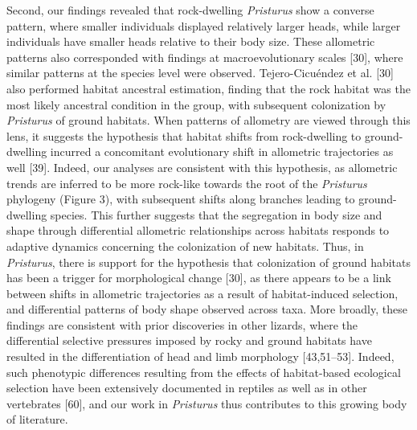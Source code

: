 \documentclass[
  11pt,
]{article}
\begin{document}
Second, our findings revealed that rock-dwelling \emph{Pristurus} show a
converse pattern, where smaller individuals displayed relatively larger
heads, while larger individuals have smaller heads relative to their
body size. These allometric patterns also corresponded with findings at
macroevolutionary scales {[}30{]}, where similar patterns at the species
level were observed. Tejero-Cicuéndez et al. {[}30{]} also performed
habitat ancestral estimation, finding that the rock habitat was the most
likely ancestral condition in the group, with subsequent colonization by
\emph{Pristurus} of ground habitats. When patterns of allometry are
viewed through this lens, it suggests the hypothesis that habitat shifts
from rock-dwelling to ground-dwelling incurred a concomitant
evolutionary shift in allometric trajectories as well {[}39{]}. Indeed,
our analyses are consistent with this hypothesis, as allometric trends
are inferred to be more rock-like towards the root of the
\emph{Pristurus} phylogeny (Figure 3), with subsequent shifts along
branches leading to ground-dwelling species. This further suggests that
the segregation in body size and shape through differential allometric
relationships across habitats responds to adaptive dynamics concerning
the colonization of new habitats. Thus, in \emph{Pristurus}, there is
support for the hypothesis that colonization of ground habitats has been
a trigger for morphological change {[}30{]}, as there appears to be a
link between shifts in allometric trajectories as a result of
habitat-induced selection, and differential patterns of body shape
observed across taxa. More broadly, these findings are consistent with
prior discoveries in other lizards, where the differential selective
pressures imposed by rocky and ground habitats have resulted in the
differentiation of head and limb morphology {[}43,51--53{]}. Indeed,
such phenotypic differences resulting from the effects of habitat-based
ecological selection have been extensively documented in reptiles as
well as in other vertebrates {[}60{]}, and our work in \emph{Pristurus}
thus contributes to this growing body of literature. \hfill\break
\end{document}
